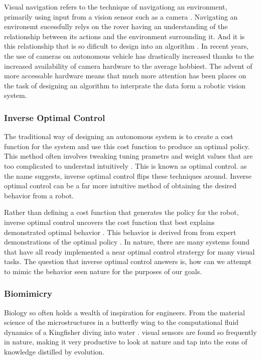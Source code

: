 \documentclass{UoNMCHA}
\numberwithin{equation}{section}
\begin{document}
Visual navigation refers to the technique of navigationg an environment, primarily using input from a vision sensor such as a camera \citep{chatterjee2012vision}. Navigating an environemt sucessfully relys on the rover having an understanding of the relationship between its actions and the environment surrounding it. And it is this relationship that is so dificult to design into an algorithm \citep{zhu2017target}. In recent years, the use of cameras on autonomous vehicle has drastically increased thanks to the increased availability of camera hardware to the average hobbiest. The advent of more accessable hardware means that much more attention has been places on the task of designing an algorithm to interprate the data form a robotic vision system.

\subsubsection{Inverse Optimal Control}\label{sec:IOC}
The traditional way of designing an autonomous system is to create a cost function for the system and use this cost function to produce an optimal policy. This method often involves tweaking tuning prametrs and weight values that are too complicated to understnd intuitively \citep{ratliffinverse}. This is known as optimal control. as the name suggests, inverse optimal control flips these techniques around. Inverse optimal control can be a far more intuitive method of obtaining the desired behavior from a robot.

Rather than defining a cost function that generates the policy for the robot, inverse optimal control uncovers the cost function that best explains demonstrated optimal behavior \citep{ratliffinverse}. This behavior is derived from from expert demonstrations of the optimal policy \citep{levine2012continuous}. In nature, there are many systems found that have all ready implemented a near optimal control stratergy for many visual tasks. The question that inverse optimal control answers is, how can we attempt to mimic the behavior seen nature for the purposes of our goals.

\subsubsection{Biomimicry}\label{sec:biomimicry}
Biology so often holds a wealth of inspiration for engineers. From the material science of the microstructures in a butterfly wing to the computational fluid dynamics of a Kingfisher diving into water \citep{benyus1997biomimicry}. visual sensors are found so frequently in nature, making it very productive to look at nature and tap into the eons of knowledge distilled by evolution.
\end{document}
